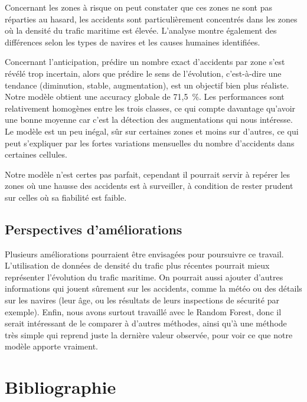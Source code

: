 \documentclass[12pt, a4paper]{report}
\begin{document}
Concernant les zones à risque on peut constater que ces zones ne sont pas réparties au hasard, les accidents sont particulièrement concentrés dans les zones où la densité du trafic maritime est élevée. L’analyse montre également des différences selon les types de navires et les causes humaines identifiées.

Concernant l'anticipation, prédire un nombre exact d'accidents par zone s'est révélé trop incertain, alors que prédire le sens de l'évolution, c'est-à-dire une tendance (diminution, stable, augmentation), est un objectif bien plus réaliste. Notre modèle obtient une accuracy globale de 71,5~\%. Les performances sont relativement homogènes entre les trois classes, ce qui compte davantage qu'avoir une bonne moyenne car c'est la détection des augmentations qui nous intéresse. Le modèle est un peu inégal, sûr sur certaines zones et moins sur d'autres, ce qui peut s'expliquer par les fortes variations mensuelles du nombre d'accidents dans certaines cellules.

Notre modèle n'est certes pas parfait, cependant il pourrait servir à repérer les zones où une hausse des accidents est à surveiller, à condition de rester prudent sur celles où sa fiabilité est faible.
\section*{Perspectives d'améliorations}

Plusieurs améliorations pourraient être envisagées pour poursuivre ce travail. L'utilisation de données de densité du trafic plus récentes pourrait mieux représenter l'évolution du trafic maritime. On pourrait aussi ajouter d'autres informations qui jouent sûrement sur les accidents, comme la météo ou des détails sur les navires (leur âge, ou les résultats de leurs inspections de sécurité par exemple). Enfin, nous avons surtout travaillé avec le Random Forest, donc il serait intéressant de le comparer à d'autres méthodes, ainsi qu'à une méthode très simple qui reprend juste la dernière valeur observée, pour voir ce que notre modèle apporte vraiment.
\chapter*{Bibliographie}
\end{document}

